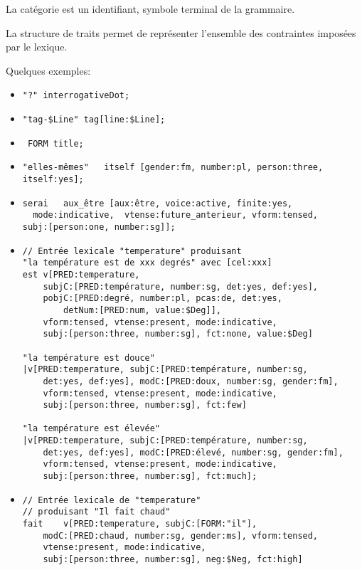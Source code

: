 \documentclass[11pt]{article}
\begin{document}
La catégorie est un identifiant, symbole terminal de la grammaire.

La structure de traits permet de représenter l'ensemble des
contraintes imposées par le lexique.

Quelques exemples:

\begin{itemize}
\item \verb#"?" interrogativeDot;#

\bigskip
\item \verb#"tag-$Line" tag[line:$Line]; #

\bigskip
\item \verb# FORM title; #

\bigskip
\item \verb#"elles-mêmes"	itself [gender:fm, number:pl, person:three, itself:yes]; #

\bigskip
\item \begin{verbatim}
serai	aux_être [aux:être, voice:active, finite:yes,
  mode:indicative,  vtense:future_anterieur, vform:tensed, 
subj:[person:one, number:sg]]; 
\end{verbatim}

\bigskip
\item \begin{verbatim}
// Entrée lexicale "temperature" produisant 
"la température est de xxx degrés" avec [cel:xxx]
est v[PRED:temperature, 
	subjC:[PRED:température, number:sg, det:yes, def:yes], 
	pobjC:[PRED:degré, number:pl, pcas:de, det:yes,
		detNum:[PRED:num, value:$Deg]], 
	vform:tensed, vtense:present, mode:indicative, 
	subj:[person:three, number:sg], fct:none, value:$Deg]

"la température est douce"
|v[PRED:temperature, subjC:[PRED:température, number:sg, 
	det:yes, def:yes], modC:[PRED:doux, number:sg, gender:fm],
	vform:tensed, vtense:present, mode:indicative, 
	subj:[person:three, number:sg], fct:few]

"la température est élevée"
|v[PRED:temperature, subjC:[PRED:température, number:sg, 
	det:yes, def:yes], modC:[PRED:élevé, number:sg, gender:fm],
	vform:tensed, vtense:present, mode:indicative, 
	subj:[person:three, number:sg], fct:much];
\end{verbatim}

\bigskip
\item \begin{verbatim}
// Entrée lexicale de "temperature"
// produisant "Il fait chaud"
fait	v[PRED:temperature, subjC:[FORM:"il"], 
	modC:[PRED:chaud, number:sg, gender:ms], vform:tensed,
	vtense:present, mode:indicative, 
	subj:[person:three, number:sg], neg:$Neg, fct:high]


\end{verbatim}
\end{itemize}
\end{document}
